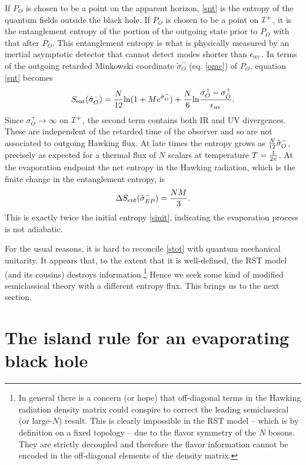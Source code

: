 \documentclass[12pt,oneside,letterpaper]{article}
\newcommand{\be}{\begin{equation}}
\newcommand{\ee}{\end{equation}}
\def\be{\begin{eqnarray}}
\def\ee{\end{eqnarray}}
\let\s=\sigma \let\t=\tau \let\u=\upsilon \let\c=\chi
\def\be{\begin{equation}}
\def\ee{\end{equation}}
\def\m{{M}}
\def\euv{\epsilon_{\rm uv}}
\def\log{{\rm ln}}
\numberwithin{equation}{section}
\def \be {\begin{equation}}
\def \ee {\end{equation}}
\begin{document}
If $P_O$ is chosen to be a point on the apparent horizon, \eqref{snt} is the entropy of the quantum fields outside the black hole. If $P_O$ is chosen to be a point on ${\cal I}^+$, 
it is the entanglement entropy of the portion of the outgoing state prior to $P_O$ with that after $P_O$. This entanglement entropy is what is physically measured by an inertial asymptotic detector that cannot detect modes shorter than $\euv$. In terms of the outgoing retarded Minkowski coordinate $\tilde \s^-_O$ (eq. \eqref{omc}) of $P_O$, equation \eqref{snt} becomes 
\be\label{sep}S_{\rm ent}(\tilde \s^-_O)=  {N \over 12}\log(1+\m e^{\tilde \s^-_O})+{N \over 6}\log{\s^+_O-\s^+_{\bar O} \over \euv}.\ee
Since $\s^+_O\to \infty$ on ${\cal I}^+$, the second term contains both IR and UV  divergences. These are independent of the retarded time of the observer and so are not
associated to outgoing Hawking  flux.  
At late times the entropy grows as ${N\over 12}\tilde \s^-_O$, precisely as expected for a thermal flux of $N$
scalars at temperature $T={1 \over 2\pi}$. At the evaporation endpoint the net entropy in the Hawking radiation, which is the finite change in the entanglement entropy,  is
\be \label{stot} \Delta S_{\rm ent}(\tilde \s^-_{EP})=  {N M\over 3}.\ee
This is exactly twice the initial entropy \eqref{sinit}, indicating the evaporation process is not adiabatic. 

For the usual reasons, it is hard to reconcile \eqref{stot} with quantum mechanical unitarity. It appears that, to the extent that it is well-defined, the RST model (and its cousins) destroys information.\footnote{In general there is a concern (or hope) that off-diagonal terms in the Hawking radiation density matrix  could conspire to correct the leading semiclassical (or large-$N$) result. This is clearly impossible in the RST model -- which is by definition on a fixed topology -- due to the flavor symmetry of the $N$ bosons. They are strictly decoupled and therefore the flavor information cannot be encoded in the off-diagonal elements of the density matrix. } Hence we seek some kind of modified semiclassical theory with a different entropy flux. This brings us to the next section. 

\section{The island rule for an evaporating black hole }
\end{document}
